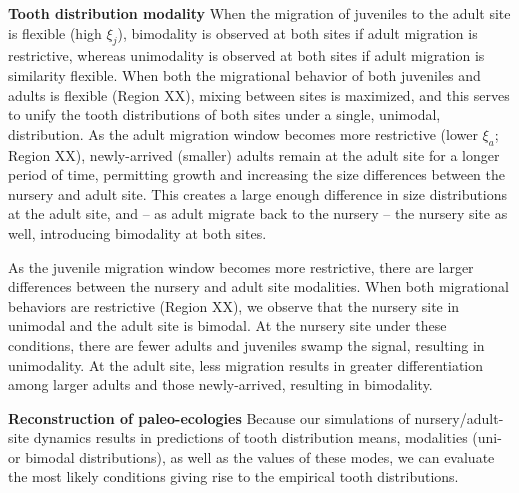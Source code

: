 \documentclass[]{rsos}%
\begin{document}
\textbf{Tooth distribution modality}
When the migration of juveniles to the adult site is flexible (high $\xi_j$), bimodality is observed at both sites if adult migration is restrictive, whereas unimodality is observed at both sites if adult migration is similarity flexible.
When both the migrational behavior of both juveniles and adults is flexible (Region XX), mixing between sites is maximized, and this serves to unify the tooth distributions of both sites under a single, unimodal, distribution.
As the adult migration window becomes more restrictive (lower $\xi_a$; Region XX), newly-arrived (smaller) adults remain at the adult site for a longer period of time, permitting growth and increasing the size differences between the nursery and adult site.
This creates a large enough difference in size distributions at the adult site, and -- as adult migrate back to the nursery -- the nursery site as well, introducing bimodality at both sites.

As the juvenile migration window becomes more restrictive, there are larger differences between the nursery and adult site modalities.
When both migrational behaviors are restrictive (Region XX), we observe that the nursery site in unimodal and the adult site is bimodal.
At the nursery site under these conditions, there are fewer adults and juveniles swamp the signal, resulting in unimodality.
At the adult site, less migration results in greater differentiation among larger adults and those newly-arrived, resulting in bimodality.








\textbf{Reconstruction of paleo-ecologies}
Because our simulations of nursery/adult-site dynamics results in predictions of tooth distribution means, modalities (uni- or bimodal distributions), as well as the values of these modes, we can evaluate the most likely conditions giving rise to the empirical tooth distributions.
\end{document}
